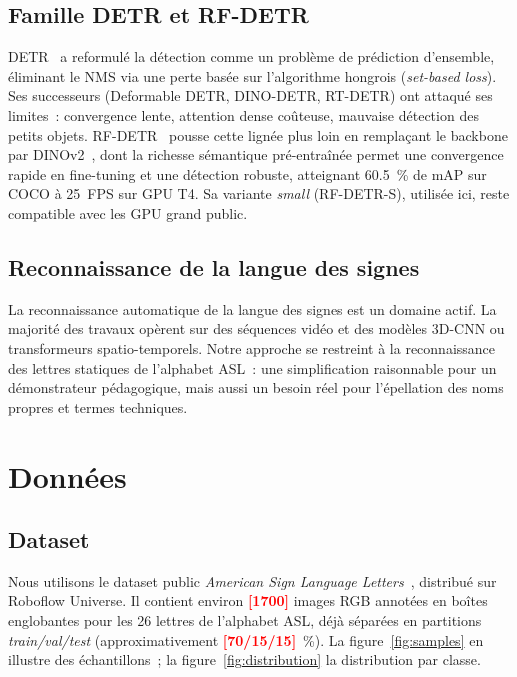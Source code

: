 \documentclass[conference]{IEEEtran}
\newcommand{\TODO}[1]{\textcolor{red}{\textbf{[#1]}}}
\begin{document}
\subsection{Famille DETR et RF-DETR}

DETR~\cite{carion2020detr} a reformulé la détection comme un problème de prédiction d'ensemble, éliminant le NMS via une perte basée sur l'algorithme hongrois (\textit{set-based loss}). Ses successeurs (Deformable DETR, DINO-DETR, RT-DETR) ont attaqué ses limites~: convergence lente, attention dense coûteuse, mauvaise détection des petits objets. RF-DETR~\cite{rfdetr2026} pousse cette lignée plus loin en remplaçant le backbone par DINOv2~\cite{oquab2023dinov2}, dont la richesse sémantique pré-entraînée permet une convergence rapide en fine-tuning et une détection robuste, atteignant \SI{60.5}{\percent} de mAP sur COCO à \SI{25}{FPS} sur GPU T4. Sa variante \textit{small} (RF-DETR-S), utilisée ici, reste compatible avec les GPU grand public.

\subsection{Reconnaissance de la langue des signes}

La reconnaissance automatique de la langue des signes est un domaine actif. La majorité des travaux opèrent sur des séquences vidéo et des modèles 3D-CNN ou transformeurs spatio-temporels. Notre approche se restreint à la reconnaissance des lettres statiques de l'alphabet ASL~: une simplification raisonnable pour un démonstrateur pédagogique, mais aussi un besoin réel pour l'épellation des noms propres et termes techniques.

\section{Données}

\subsection{Dataset}

Nous utilisons le dataset public \textit{American Sign Language Letters}~\cite{aslroboflow}, distribué sur Roboflow Universe. Il contient environ \TODO{1700} images RGB annotées en boîtes englobantes pour les 26 lettres de l'alphabet ASL, déjà séparées en partitions \textit{train/val/test} (approximativement \TODO{70/15/15}~\%). La figure~\ref{fig:samples} en illustre des échantillons~; la figure~\ref{fig:distribution} la distribution par classe.
\end{document}
